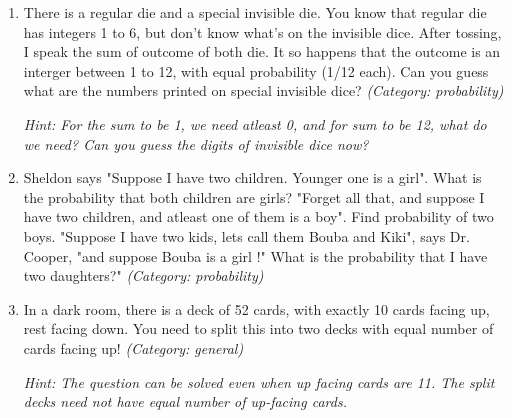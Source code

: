 \begin{enumerate}




\item There is a regular die and a special invisible die. You know that regular die has integers 1 to 6, but don't know what's on the invisible dice. After tossing, I speak the sum of outcome of both die. It so happens that the outcome is an interger between 1 to 12, with equal probability (1/12 each). Can you guess what are the numbers printed on special invisible dice?
\small\emph{(Category: probability)}

\small\emph{Hint: For the sum to be 1, we need atleast 0, and for sum to be 12, what do we need? Can you guess the digits of invisible dice now?}





\item Sheldon says "Suppose I have two children. Younger one is a girl". What is the probability that both children are girls?
"Forget all that, and suppose I have two children, and atleast one of them is a boy". Find probability of two boys.
"Suppose I have two kids, lets call them Bouba and Kiki", says Dr. Cooper, "and suppose Bouba is a girl !" What is the probability that I have two daughters?"
\small\emph{(Category: probability)}




\item In a dark room, there is a deck of 52 cards, with exactly 10 cards facing up, rest facing down. You need to split this into two decks with equal number of cards facing up!
\small\emph{(Category: general)}

\small\emph{Hint: The question can be solved even when up facing cards are 11. The split decks need not have equal number of up-facing cards.}





\end{enumerate}
